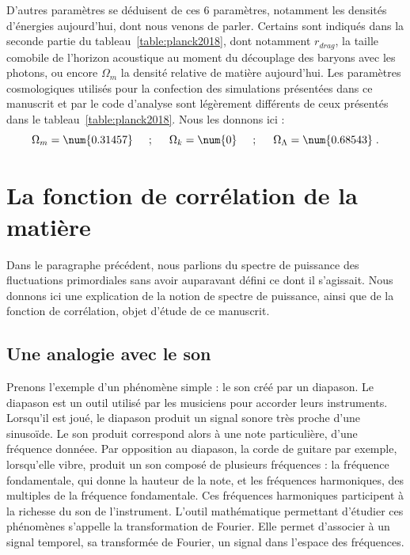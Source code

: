 D'autres paramètres se déduisent de ces 6 paramètres, notamment les densités d'énergies aujourd'hui, dont nous venons de parler. Certains sont indiqués dans la seconde partie du tableau~\ref{table:planck2018},
dont notamment $r_{drag}$, la taille comobile de l'horizon acoustique au moment du découplage des baryons avec les photons,
ou encore $\Omega_m$ la densité relative de matière aujourd'hui. Les paramètres cosmologiques utilisés pour la confection des simulations présentées dans ce manuscrit et par le code d'analyse \picca{} sont légèrement différents de ceux présentés dans le tableau~\ref{table:planck2018}. Nous les donnons ici :
\begin{equation}
  \label{eq:par_cosmo}
  \Omega_m = \num{0.31457} \hspace{0.5cm} ; \hspace{0.5cm} \Omega_k = \num{0} \hspace{0.5cm} ; \hspace{0.5cm} \Omega_{\Lambda} = \num{0.68543}  \; .
\end{equation}



\section{La fonction de corrélation de la matière}

Dans le paragraphe précédent, nous parlions du spectre de puissance des fluctuations primordiales sans avoir auparavant défini ce dont il s'agissait. Nous donnons ici une explication de la notion de spectre de puissance, ainsi que de la fonction de corrélation, objet d'étude de ce manuscrit.

\subsection{Une analogie avec le son}

Prenons l'exemple d'un phénomène simple : le son créé par un diapason. Le diapason est un outil utilisé par les musiciens pour accorder leurs instruments. Lorsqu'il est joué, le diapason produit un signal sonore très proche d'une sinusoïde.
Le son produit correspond alors à une note particulière, d'une fréquence donnéee. Par opposition au diapason, la corde de guitare par exemple, lorsqu'elle vibre, produit un son composé de plusieurs fréquences : la fréquence fondamentale, qui donne la hauteur de la note, et les fréquences harmoniques, des multiples de la fréquence fondamentale. Ces fréquences harmoniques participent à la richesse du son de l'instrument. L'outil mathématique permettant d'étudier ces phénomènes s'appelle la transformation de Fourier. Elle permet d'associer à un signal temporel, sa transformée de Fourier, un signal dans l'espace des fréquences.

